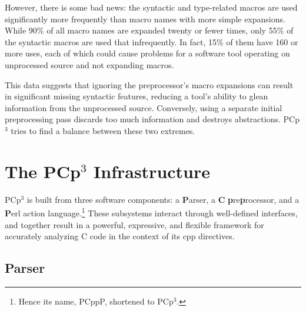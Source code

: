 \documentclass{article}
\newcommand{\pcp}{\mbox{\textsf{PCp}$^3$}}
\newcommand{\pcppp}{\mbox{\textsf{PCppP}}}
\newcommand{\Cpp}{\mbox{\textsf{cpp}}}
\newcommand{\C}{\mbox{\textsf{C}}}
\newcommand{\ppd}[1]{\texttt{\##1}}
\begin{document}
However, there is some bad news: the syntactic and type-related macros
are used significantly more frequently than macro names with more simple
expansions.  While 90\% of all macro names are expanded twenty or fewer
times, only 55\% of the syntactic macros are used that infrequently.  In
fact, 15\% of them have 160 or more uses, each of which could cause
problems for a software tool operating on unprocessed source and not
expanding macros.

This data suggests that ignoring the preprocessor's macro expansions can
result in significant missing syntactic features, reducing a tool's
ability to glean information from the unprocessed source.  Conversely,
using a separate initial preprocessing pass discards too much
information and destroys abstractions.  \pcp{} tries to find a balance
between these two extremes.




\section{The \pcp{} Infrastructure}
\label{sec:pcp3}
\pcp{} is built from three software components: a \textbf{\textsf{P}}arser, a \textbf{\textsf{C}}
\textbf{\textsf{p}}re\textbf{\textsf{p}}rocessor, and a \textbf{\textsf{P}}erl action
language.\footnote{Hence its name, \pcppp{}, shortened to \pcp{}.}
These subsystems interact through well-defined interfaces, and together
result in a powerful, expressive, and flexible framework for accurately
analyzing \C{} code in the context of its \Cpp{} directives.

\subsection{Parser}
\end{document}
